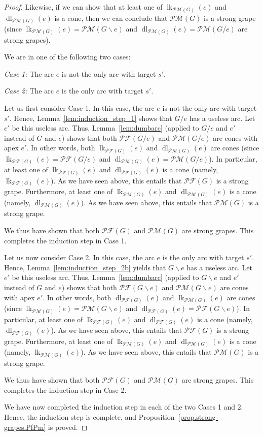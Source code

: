 \documentclass[10pt,a4paper]{amsart}
\DeclareMathOperator{\dl}{dl}
\DeclareMathOperator{\lk}{lk}
\newcommand{\Pf}[1]{\mathcal{PF}\left(#1\right)}
\newcommand{\Pm}[1]{\mathcal{PM}\left(#1\right)}
\begin{document}
\begin{proof}
Likewise, if we can show that at least one of
$\lk_{\Pm{G}}(e)$ and $\dl_{\Pm{G}}(e)$ is a cone,
then we can conclude that $\Pm{G}$ is a strong grape
(since $\lk_{\Pm{G}}(e) = \Pm{G \backslash e}$ and
$\dl_{\Pm{G}}(e) = \Pm{G / e}$ are strong grapes).

We are in one of the following two cases:

\textit{Case 1:} The arc $e$ is not the only arc with target $s'$.

\textit{Case 2:} The arc $e$ is the only arc with target $s'$.

Let us first consider Case 1.
In this case, the arc $e$ is not the only arc with target $s'$.
Hence, Lemma~\ref{lem:induction_step_1} shows that
$G / e$ has a useless arc.
Let $e'$ be this useless arc.
Thus, Lemma~\ref{lem:dumbarc} (applied to $G / e$ and $e'$ instead
of $G$ and $e$) shows that
both $\Pf{G / e}$ and $\Pm{G / e}$ are cones with apex $e'$.
In other words,
both $\lk_{\Pf{G}}(e)$ and $\dl_{\Pm{G}}(e)$ are cones
(since $\lk_{\Pf{G}}(e) = \Pf{G / e}$
and $\dl_{\Pm{G}}(e) = \Pm{G / e}$).
%
In particular, at least one of
$\lk_{\Pf{G}}(e)$ and $\dl_{\Pf{G}}(e)$ is a cone
(namely, $\lk_{\Pf{G}}(e)$).
As we have seen above, this entails that $\Pf{G}$ is a strong grape.
%
Furthermore, at least one of
$\lk_{\Pm{G}}(e)$ and $\dl_{\Pm{G}}(e)$ is a cone
(namely, $\dl_{\Pm{G}}(e)$).
As we have seen above, this entails that $\Pm{G}$ is a strong grape.

We thus have shown that
both $\Pf{G}$ and $\Pm{G}$ are strong grapes.
This completes the induction step in Case 1.

Let us now consider Case 2.
In this case, the arc $e$ is the only arc with target $s'$.
%
Hence, Lemma~\ref{lem:induction_step_2b} yields that
$G \backslash e$ has a useless arc.
Let $e'$ be this useless arc.
Thus, Lemma~\ref{lem:dumbarc} (applied to $G \backslash e$ and $e'$ instead
of $G$ and $e$) shows that
both $\Pf{G \backslash e}$ and $\Pm{G \backslash e}$ are cones with apex $e'$.
In other words,
both $\dl_{\Pf{G}}(e)$ and $\lk_{\Pm{G}}(e)$ are cones
(since $\lk_{\Pm{G}}(e) = \Pm{G \backslash e}$
and $\dl_{\Pf{G}}(e) = \Pf{G \backslash e}$).
%
In particular, at least one of
$\lk_{\Pf{G}}(e)$ and $\dl_{\Pf{G}}(e)$ is a cone
(namely, $\dl_{\Pf{G}}(e)$).
As we have seen above, this entails that $\Pf{G}$ is a strong grape.
%
Furthermore, at least one of
$\lk_{\Pm{G}}(e)$ and $\dl_{\Pm{G}}(e)$ is a cone
(namely, $\lk_{\Pm{G}}(e)$).
As we have seen above, this entails that $\Pm{G}$ is a strong grape.

We thus have shown that
both $\Pf{G}$ and $\Pm{G}$ are strong grapes.
This completes the induction step in Case 2.

We have now completed the induction step in each of
the two Cases 1 and 2.
Hence, the induction step is complete,
and Proposition~\ref{prop.strong-grapes.PfPm} is proved.
\end{proof}
\end{document}
